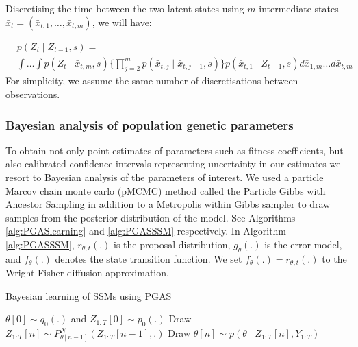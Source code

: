 \documentclass{article}
\begin{document}
Discretising the time between the two latent states using $m$ intermediate states $\bar{x}_t = (\bar{x}_{t,1}, \ldots, \bar{x}_{t, m})$, we will have:

\begin{align*} \label{eq:rejuvenationtarget}
& p(Z_t \mid Z_{t-1}, s) = \\ 
& \int \ldots \int p(Z_t \mid \bar{x}_{t, m}, s)  \{  \prod_{j=2}^{m} p(\bar{x}_{t,j} \mid \bar{x}_{t,j-1} , s)  \} p(\bar{x}_{t,1} \mid Z_{t-1}, s) d\bar{x}_{1,m}  \ldots d\bar{x}_{t,m}
\end{align*}
For simplicity, we assume the same number of discretisations between observations.

\subsubsection{Bayesian analysis of population genetic parameters}
To obtain not only point estimates of parameters such as fitness coefficients, but also calibrated confidence intervals representing uncertainty in our estimates we resort to Bayesian analysis of the parameters of interest.
We used a particle Marcov chain monte carlo (pMCMC) method called the Particle Gibbs with Ancestor Sampling \cite{lindsten2014particle} in addition to a Metropolis within Gibbs sampler to draw samples from the posterior distribution of the model.
See Algorithms \ref{alg:PGASlearning} and \ref{alg:PGASSSM} respectively. 
In Algorithm \ref{alg:PGASSSM}, $r_{\theta, t}(.)$ is the proposal distribution,
$g_{\theta}(.)$ is the error model, and $f_{\theta}(.)$ denotes the state transition function.
We set $f_{\theta}(.) = r_{\theta, t}(.)$ to the Wright-Fisher diffusion approximation.

\begin{algorithm}
\caption{Bayesian learning of SSMs using PGAS} \label{alg:PGASlearning}
\begin{algorithmic}[1]
\State $\theta[0] \sim q_0(.)$ and $Z_{1:T}[0] \sim p_0(.)$
\State Draw $Z_{1:T}[n] \sim P_{\theta[n-1]}^N(Z_{1:T}[n-1], .)$
\State Draw $\theta[n] \sim p(\theta \mid Z_{1:T}[n], Y_{1:T}) $
\EndFor
\EndProcedure
\end{algorithmic}
\end{algorithm}
\end{document}
